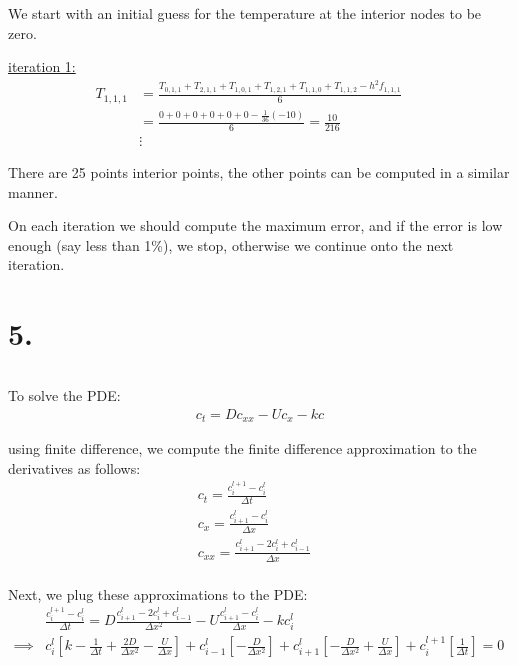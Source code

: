 \documentclass{article}
\begin{document}
We start with an initial guess for the temperature at the interior nodes to be zero.
\newline

\underline{iteration 1:}
\begin{align*}
  T_{1,1,1}
  &= 
  \frac
  {
  T_{0,1,1} + T_{2,1,1}
  +
  T_{1,0,1} + T_{1,2,1}
  +
  T_{1,1,0} + T_{1,1,2}
  - h^2 f_{1,1,1}
  }
  {6} &&\\
  &=
  \frac
  {
  0 + 0
  +
  0 + 0
  +
  0 + 0
  - \frac{1}{36}(-10)
  }
  {6}
  = \frac{10}{216} &&\\
  &\vdots
\end{align*}

There are 25 points interior points, the other points can be computed in a similar manner.
\newline

On each iteration we should compute the maximum error, and if the error is low enough (say less than 1\%), we stop, otherwise we continue onto the next iteration.


\section*{5.}
$ $

To solve the PDE:
\begin{align*}
  c_t = D c_{xx} - U c_x - k c  
\end{align*}

using finite difference, we compute the finite difference approximation to the derivatives as follows:
\begin{align*}
  &c_t = \frac{c_{i}^{l+1} - c_{i}^{l}}{\Delta t} &&\\
  &c_x = \frac{c_{i+1}^{l} - c_{i}^{l}}{\Delta x} &&\\
  &c_{xx} = \frac{c_{i+1}^{l} - 2c_{i}^{l} + c_{i-1}^{l}}{\Delta x} &&\\
\end{align*}

Next, we plug these approximations to the PDE:
\begin{align*}
  &\frac{c_{i}^{l+1} - c_{i}^{l}}{\Delta t}
  =
  D \frac{c_{i+1}^{l} - 2c_{i}^{l} + c_{i-1}^{l}}{\Delta x^2}
  -
  U \frac{c_{i+1}^{l} - c_{i}^{l}}{\Delta x}
  -
  k c_{i}^{l} &&\\
  \implies& c_{i}^{l} 
  [k
  -\frac{1}{\Delta t}
  + \frac{2D}{\Delta x^2}
  - \frac{U}{\Delta x}
  ]
  +
  c_{i-1}^{l}
  [- \frac{D}{\Delta x^2}]
  +
  c_{i+1}^{l}
  [-\frac{D}{\Delta x^2}
  +
  \frac{U}{\Delta x}
  ]
  +
  c_{i}^{l+1}
  [\frac{1}{\Delta t}]
  =
  0
\end{align*}
\end{document}
